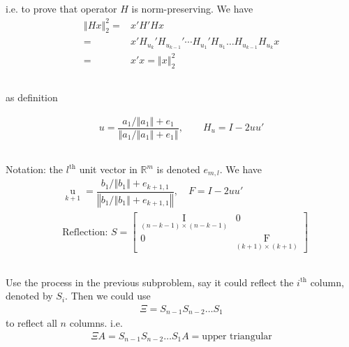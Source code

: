 \documentclass[11pt,a4paper]{ctexart}
\numberwithin{equation}{section}%
\begin{document}
\subsection{}
i.e. to prove that operator $ H $ is norm-preserving. We have
\begin{align*}
    \left\Vert Hx \right\Vert _2^2 =& x'H'Hx\\
    =& x'H_{u_k}'H_{u_{k-1}}'\cdots H_{u_1}'H_{u_1}\ldots H_{u_{k-1}}H_{u_k}x \\
    =& x'x = \left\Vert x \right\Vert _2^2 
\end{align*}

\subsection{}
as definition

\begin{align*}
    u = \dfrac{ a_1/\left\Vert a_1 \right\Vert +e_1 }{ \left\Vert a_1/\left\Vert a_1 \right\Vert +e_1 \right\Vert  } ,\qquad H_u = I-2uu'
\end{align*}

\subsection{}
Notation: the $ l^\mathrm{ th }  $ unit vector in $ \mathbb{R}^m $ is denoted $ e_{m,l} $. We have
\begin{align*}
    &\mathop{ u }\limits_{k+1}=\dfrac{ b_1/\left\Vert b_1 \right\Vert + e_{k+1,1}  }{ \left\Vert b_1/\left\Vert b_1 \right\Vert + e_{k+1,1} \right\Vert  },\quad F=I-2uu'\\
    &\text{Reflection: }S=\begin{bmatrix}
        \mathop{ I }\limits_{(n-k-1)\times (n-k-1)} & 0\\
        0& \mathop{ F }\limits_{(k+1)\times (k+1)} 
    \end{bmatrix}
\end{align*}

\subsection{}
Use the process in the previous subproblem, say it could reflect the $ i^\mathrm{ th }  $ column, denoted by $ S_i $. Then we could use 
\begin{align*}
    \Xi=S_{n-1}S_{n-2}\ldots S_1 
\end{align*}
to reflect all $ n $ columns. i.e.
\begin{align*}
    \Xi A = S_{n-1}S_{n-2}\ldots S_1  A = \text{upper triangular}
\end{align*}
\end{document}
